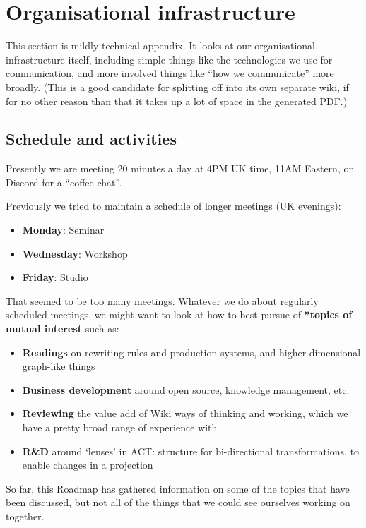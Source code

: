 \documentclass[11pt]{article}
\begin{document}
\section{Organisational infrastructure}
\label{sec:orgd5da0fe}
This section is mildly-technical appendix.  It looks at our
organisational infrastructure itself, including simple things like the
technologies we use for communication, and more involved things like
“how we communicate” more broadly.  (This is a good candidate for
splitting off into its own separate wiki, if for no other reason than
that it takes up a lot of space in the generated PDF.)

\subsection{Schedule and activities}
\label{sec:org8c71d01}

Presently we are meeting 20 minutes a day at 4PM UK time, 11AM
Eastern, on Discord for a “coffee chat”.

Previously we tried to maintain a schedule of longer meetings (UK
evenings):

\begin{itemize}
\item \textbf{Monday}: Seminar
\item \textbf{Wednesday}: Workshop
\item \textbf{Friday}: Studio
\end{itemize}

That seemed to be too many meetings.  Whatever we do about regularly
scheduled meetings, we might want to look at how to best pursue of
\textbf{*topics of mutual interest} such as:

\begin{itemize}
\item \textbf{Readings} on rewriting rules and production systems, and higher-dimensional graph-like things
\item \textbf{Business development} around open source, knowledge management, etc.
\item \textbf{Reviewing} the value add of Wiki ways of thinking and working, which we have a pretty broad range of experience with
\item \textbf{R\&D} around ‘lenses’ in ACT: structure for bi-directional transformations, to enable changes in a projection
\end{itemize}

So far, this Roadmap has gathered information on some of the topics
that have been discussed, but not all of the things that we could see
ourselves working on together.
\end{document}
